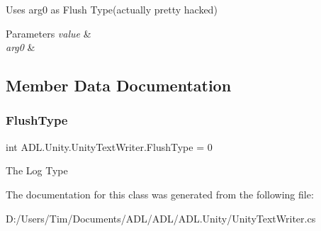 Uses arg0 as Flush Type(actually pretty hacked) 


\begin{DoxyParams}{Parameters}
{\em value} & \\
\hline
{\em arg0} & \\
\hline
\end{DoxyParams}


\subsection{Member Data Documentation}
\mbox{\label{class_a_d_l_1_1_unity_1_1_unity_text_writer_a5d9cf1373da2cf300bf88f11f8ec078a}} 
\subsubsection{\texorpdfstring{Flush\+Type}{FlushType}}
{\footnotesize\ttfamily int A\+D\+L.\+Unity.\+Unity\+Text\+Writer.\+Flush\+Type = 0}



The Log Type 



The documentation for this class was generated from the following file\+:\begin{DoxyCompactItemize}
\item 
D\+:/\+Users/\+Tim/\+Documents/\+A\+D\+L/\+A\+D\+L/\+A\+D\+L.\+Unity/Unity\+Text\+Writer.\+cs\end{DoxyCompactItemize}
